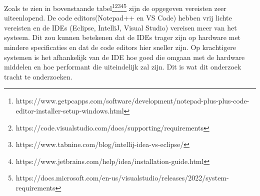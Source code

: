 Zoals te zien in bovenstaande tabel\footnote{https://www.getpcapps.com/software/development/notepad-plus-plus-code-editor-installer-setup-windows.html}\footnote{https://code.visualstudio.com/docs/supporting/requirements}\footnote{https://www.tabnine.com/blog/intellij-idea-vs-eclipse/}\footnote{https://www.jetbrains.com/help/idea/installation-guide.html}\footnote{https://docs.microsoft.com/en-us/visualstudio/releases/2022/system-requirements} zijn de opgegeven vereisten zeer uiteenlopend. De code editors(Notepad++ en VS Code) hebben vrij lichte vereisten en de IDEs (Eclipse, IntelliJ, Visual Studio) vereisen meer van het systeem. Dit zou kunnen betekenen dat de IDEs trager zijn op hardware met mindere specificaties en dat de code editors hier sneller zijn. Op krachtigere systemen is het afhankelijk van de IDE hoe goed die omgaan met de hardware middelen en hoe performant die uiteindelijk zal zijn. Dit is wat dit onderzoek tracht te onderzoeken.
